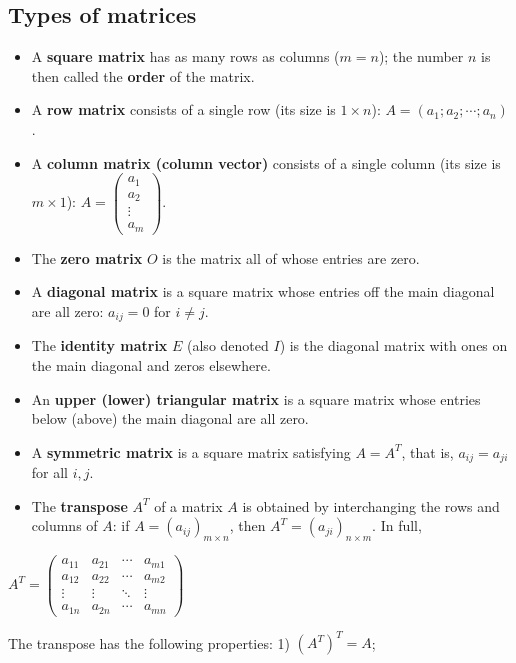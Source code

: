 \subsection{Types of matrices}
\begin{itemize}[leftmargin=1.3em]
\item A \textbf{square matrix} has as many rows as columns ($m=n$); the number $n$
is then called the \textbf{order} of the matrix.
\item A \textbf{row matrix} consists of a single row (its size is $1 \times n$):
$A = (a_1; a_2; \cdots; a_n)$.
\item A \textbf{column matrix (column vector)} consists of a single column (its size
is $m \times 1$): $A = \begin{pmatrix} a_1\\a_2\\ \vdots\\a_m\end{pmatrix}$.
\item The \textbf{zero matrix} $O$ is the matrix all of whose entries are zero.
\item A \textbf{diagonal matrix} is a square matrix whose entries off the main
diagonal are all zero: $a_{ij}=0$ for $i\neq j$.
\item The \textbf{identity matrix} $E$ (also denoted $I$) is the diagonal matrix
with ones on the main diagonal and zeros elsewhere.
\item An \textbf{upper (lower) triangular matrix} is a square matrix whose entries
below (above) the main diagonal are all zero.
\item A \textbf{symmetric matrix} is a square matrix satisfying $A = A^{T}$, that is,
$a_{ij} = a_{ji}$ for all $i,j$.
\item The \textbf{transpose} $A^{T}$ of a matrix $A$ is obtained by interchanging
the rows and columns of $A$: if $A=(a_{ij})_{m\times n}$, then
$A^{T}=(a_{ji})_{n\times m}$. In full,
\end{itemize}
\begin{center}
$A^{T}=\begin{pmatrix}
a_{11} & a_{21} & \cdots & a_{m1} \\
a_{12} & a_{22} & \cdots & a_{m2} \\
\vdots & \vdots & \ddots & \vdots \\
a_{1n} & a_{2n} & \cdots & a_{mn}
\end{pmatrix}$
 \end{center}
 The transpose has the following properties:
 1) $(A^{T})^{T}=A$;

